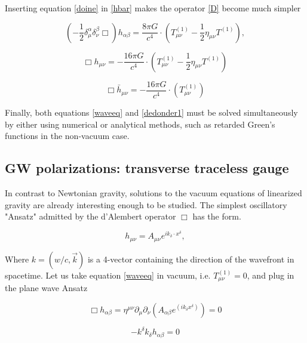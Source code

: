 Inserting equation \ref{doine} in \ref{hbar} makes the operator \ref{D} become much simpler


\begin{equation}\label{waveeq}
\left( -\frac{1}{2} \delta_{\mu}^{\alpha} \delta_{\nu}^{\beta} \Box \right) h_{\alpha \beta} = \frac{8\pi G}{c^4} \cdot (T^{(1)}_{\mu\nu} - \frac{1}{2} \eta_{\mu\nu} T^{(1)}),
\end{equation}


\begin{equation}\label{dedonder1}
\Box h_{\mu\nu} = -\frac{16\pi G}{c^4} \cdot (T^{(1)}_{\mu\nu} - \frac{1}{2} \eta_{\mu\nu} T^{(1)})
\end{equation}

\begin{equation}\label{dedonder2}
\Box \bar{h}_{\mu\nu} = -\frac{16\pi G}{c^4} \cdot (T^{(1)}_{\mu\nu})
\end{equation}
 

Finally, both equations \ref{waveeq} and \ref{dedonder1} must be solved simultaneously by either using numerical or analytical methods, such as retarded Green's functions in the non-vacuum case. 


\subsection{GW polarizations: transverse traceless gauge}

In contrast to Newtonian gravity, solutions to the vacuum equations of linearized gravity are already interesting enough to be studied. The simplest oscillatory "Ansatz" admitted by the d'Alembert operator $\Box$ has the form.   

\begin{equation}\label{planew}
h_{\mu\nu} = A_{\mu\nu} e^{i k_{\delta} \cdot x^{\delta}},
\end{equation}

Where $k = (w/c, \vec{k})$ is a 4-vector containing the direction of the wavefront in spacetime. Let us take equation \ref{waveeq} in vacuum, i.e. $T^{(1)}_{\mu \nu} = 0$, and plug in the plane wave Ansatz

\begin{equation}
\Box h_{\alpha \beta} = \eta^{\mu \nu} \partial_{\mu} \partial_{\nu} \left( A_{\alpha \beta} e^{(i k_{\delta} x^{\delta})} \right) = 0 
\end{equation}

\begin{equation}
- k^\delta k_\delta h_{\alpha \beta} = 0 
\end{equation}

